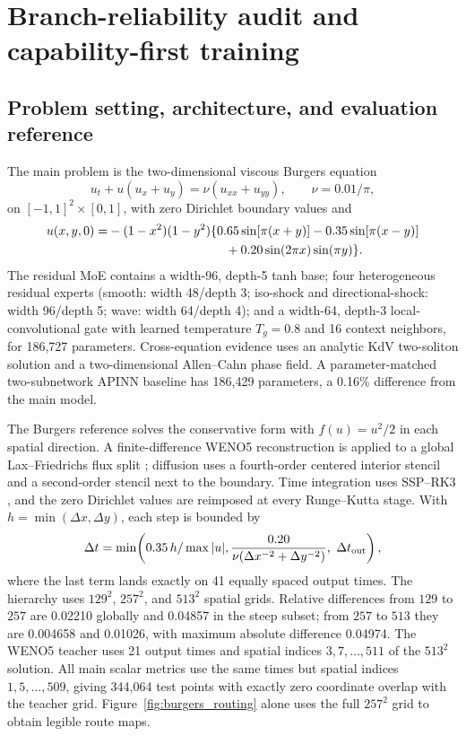 \documentclass[preprint,12pt]{elsarticle}
\theoremstyle{remark}
\begin{document}
\section{Branch-reliability audit and capability-first training}
\subsection{Problem setting, architecture, and evaluation reference}
The main problem is the two-dimensional viscous Burgers equation
\begin{equation}
u_t+u(u_x+u_y)=\nu(u_{xx}+u_{yy}),\qquad \nu=0.01/\pi,
\end{equation}
on $[-1,1]^2\times[0,1]$, with zero Dirichlet boundary values and
\begin{align}
u(x,y,0)=&-(1-x^2)(1-y^2)\{0.65\sin[\pi(x+y)]-0.35\sin[\pi(x-y)]\nonumber\\
&\hspace{33mm}+0.20\sin(2\pi x)\sin(\pi y)\}.
\label{eq:burgers_ic}
\end{align}
The residual MoE contains a width-96, depth-5 tanh base; four heterogeneous residual experts (smooth: width 48/depth 3; iso-shock and directional-shock: width 96/depth 5; wave: width 64/depth 4); and a width-64, depth-3 local-convolutional gate with learned temperature $T_g=0.8$ and 16 context neighbors, for 186,727 parameters. Cross-equation evidence uses an analytic KdV two-soliton solution and a two-dimensional Allen--Cahn phase field. A parameter-matched two-subnetwork APINN baseline has 186,429 parameters, a 0.16\% difference from the main model.

The Burgers reference solves the conservative form with $f(u)=u^2/2$ in each spatial direction. A finite-difference WENO5 reconstruction is applied to a global Lax--Friedrichs flux split \cite{shu1988eno,jiang1996weno}; diffusion uses a fourth-order centered interior stencil and a second-order stencil next to the boundary. Time integration uses SSP--RK3 \cite{gottlieb2001ssp}, and the zero Dirichlet values are reimposed at every Runge--Kutta stage. With $h=\min(\Delta x,\Delta y)$, each step is bounded by
\begin{equation}
\Delta t=\min\!\left(0.35\,h/\max|u|,
\frac{0.20}{\nu(\Delta x^{-2}+\Delta y^{-2})},\ \Delta t_{\rm out}\right),
\end{equation}
where the last term lands exactly on 41 equally spaced output times. The hierarchy uses $129^2$, $257^2$, and $513^2$ spatial grids. Relative differences from $129$ to $257$ are 0.02210 globally and 0.04857 in the steep subset; from $257$ to $513$ they are 0.004658 and 0.01026, with maximum absolute difference 0.04974. The WENO5 teacher uses 21 output times and spatial indices $3,7,\ldots,511$ of the $513^2$ solution. All main scalar metrics use the same times but spatial indices $1,5,\ldots,509$, giving 344,064 test points with exactly zero coordinate overlap with the teacher grid. Figure~\ref{fig:burgers_routing} alone uses the full $257^2$ grid to obtain legible route maps.
\end{document}
